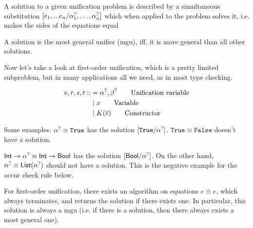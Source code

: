 \documentclass[twoside,12pt,a4paper]{article}
\begin{document}
\begin{definition}[Solution]
    A solution to a given unification problem is described by a simultaneous substitution $[e_1,...e_n / \alpha^?_1, \dots, \alpha^?_n]$
    which when applied to the problem solves it, i.e. makes the sides of the equations equal %
\end{definition}
    
\begin{definition}
    A solution is the most general unifier (mgu), iff. it is more general than all other solutions.
\end{definition} 

Now let's take a look at first-order unification, which is a pretty limited subproblem, 
but in many applications all we need, as in most type checking.

\begin{definition}
\begin{align*}
    e,r,s,t ::&= \alpha^?, \beta^? \tag*{Unification variable}\\
    &\;|\; x\tag*{Variable} \\
    &\;|\; K(\overline{e}) \tag*{Constructor}
\end{align*}
\end{definition}

Some examples:
$\alpha^? \equiv \mathtt{True}$ has the solution $[\mathtt{True}/\alpha^?]$.
$\mathtt{True \equiv False}$ doesn't have a solution.

$\mathsf{Int \rightarrow \alpha^? \equiv Int \rightarrow Bool}$ has the solution $[\mathsf{Bool}/\alpha^?]$. 
On the other hand, $\mathsf{\alpha^?\equiv List(\alpha^?)}$ should not have a solution. This is the negative example for the occur check rule below.


\begin{theorem}
    For first-order unification, there exists an algorithm on equations $\overline{e\equiv e}$, which always terminates, and returns the solution if there exists one. 
    In particular, this solution is always a mgu (i.e. if there is a solution, then there always exists a most general one).
\end{theorem}
\end{document}
